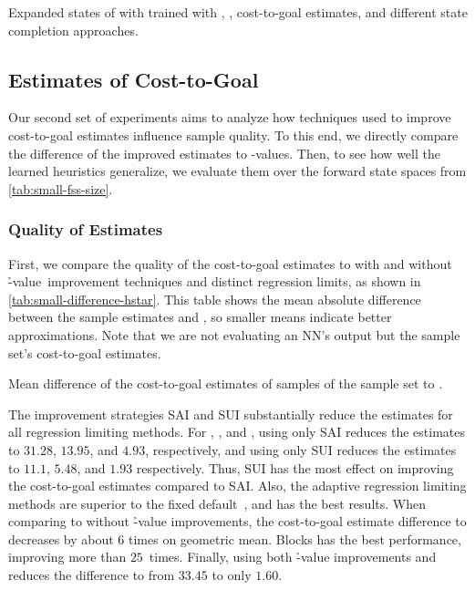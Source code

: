 \begin{table}[tb]
    \caption[Expanded states from different state completion approaches.]{Expanded states of \gbfs with \hnn trained with \bfsrw, \rlmeanfx, \hstar cost-to-goal estimates, and different state completion approaches.}
    \label{tab:small-state-completion}
    \addmargin
    \centering
    
\end{table}

\subsection{Estimates of Cost-to-Goal}
\label{sec:small-exps-hvalue}

Our second set of experiments aims to analyze how techniques used to improve cost-to-goal estimates influence sample quality. To this end, we directly compare the difference of the improved estimates to \hstar-values. Then, to see how well the learned heuristics generalize, we evaluate them over the forward state spaces from \cref{tab:small-fss-size}.

\subsubsection{Quality of Estimates}
\label{sec:small-exps-hvalue-quality}

First, we compare the quality of the cost-to-goal estimates to \hstar with and without \h-value~improvement techniques and distinct regression limits, as shown in \cref{tab:small-difference-hstar}. This table shows the mean absolute difference between the sample estimates and \hstar, so smaller means indicate better approximations. Note that we are not evaluating an NN's output but the sample set's cost-to-goal estimates.

\begin{table}[tb]
    \caption[Mean difference of the cost-to-goal estimates to \hstar.]{Mean difference of the cost-to-goal estimates of samples of the sample set to \hstar.}
    \label{tab:small-difference-hstar}
    \addmargin
    \centering
    
\end{table}

The improvement strategies SAI and SUI substantially reduce the estimates for all regression limiting methods. For \rldefault, \rlfacts, and \rlmeanfx, using only SAI reduces the estimates to $31.28$, $13.95$, and $4.93$, respectively, and using only SUI reduces the estimates to $11.1$, $5.48$, and $1.93$ respectively. Thus, SUI has the most effect on improving the cost-to-goal estimates compared to SAI.
Also, the adaptive regression limiting methods are superior to the fixed default~\rldefault, and \rlmeanfx has the best results. When comparing \rldefault to \rlmeanfx without \h-value improvements, the cost-to-goal estimate difference to \hstar decreases by about $6$ times on geometric mean. Blocks has the best performance, improving more than $25$~times. Finally, using both \h-value improvements and \rlmeanfx reduces the difference to \hstar from $33.45$ to only $1.60$.


